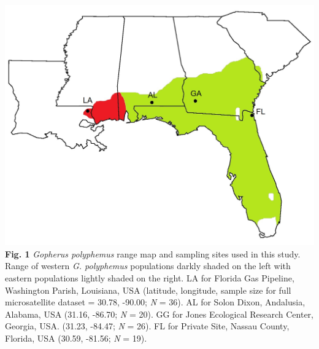 \documentclass[english]{article}\usepackage[]{graphicx}\usepackage[]{color}
\begin{document}
\pagebreak{}
\noindent
\includegraphics [scale=1.0]{range_map}
\noindent
\textbf{Fig. 1} \textit{Gopherus polyphemus} range map and sampling sites used in this study. Range of western \textit{G. polyphemus} populations darkly shaded on the left with eastern populations lightly shaded on the right. LA for Florida Gas Pipeline, Washington Parish, Louisiana, USA (latitude, longitude, sample size for full microsatellite dataset = 30.78, -90.00; \textit{N} = 36). AL for Solon Dixon, Andalusia, Alabama, USA (31.16, -86.70; \textit{N} = 20). GG for Jones Ecological Research Center, Georgia, USA. (31.23, -84.47; \textit{N} = 26). FL for Private Site, Nassau County, Florida, USA (30.59, -81.56; \textit{N} = 19).\\
\end{document}
